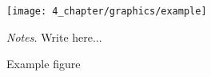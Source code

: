 \begin{figure}[htbp]
\centering
\texttt{[image: 4\_chapter/graphics/example]}
\caption{\label{fig:chapter1-example}Example figure}
\begin{flushleft}
\emph{Notes.} Write here...
\end{flushleft}
\end{figure}
